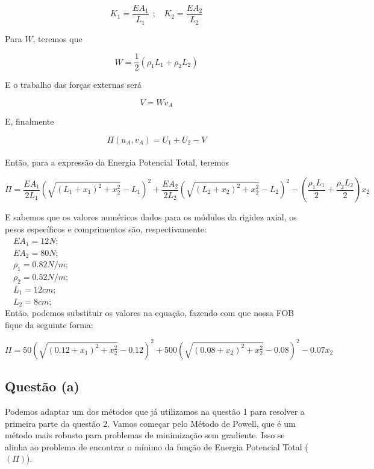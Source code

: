 \documentclass[a4paper, 12pt]{article}
\begin{document}
\begin{equation}
    K_1 = \frac{EA_1}{L_1} \>\ ;\>\ \>\ K_2 = \frac{EA_2}{L_2}
\end{equation}

Para $W$, teremos que

\begin{equation}
    W = \frac{1}{2}(\rho_1 L_1 + \rho_2 L_2)
\end{equation}

E o trabalho das forças externas será

\begin{equation}
    V = W v_A
\end{equation}

E, finalmente

\begin{equation}
    \Pi (u_A, v_A) = U_1 + U_2 - V
\end{equation}\\

Então, para a expressão da Energia Potencial Total, teremos


\begin{equation}
    \Pi = \frac{EA_1}{2L_1} (\sqrt{(L_1 + x_1)^2 + x_2^2} - L_1)^2 + \frac{EA_2}{2L_2} (\sqrt{(L_2 + x_2)^2 + x_2^2} - L_2)^2 - (\frac{\rho_1 L_1}{2} + \frac{\rho_2 L_2}{2})x_2 
\end{equation}

E sabemos que os valores numéricos dados para os módulos da rigidez axial, os pesos específicos e comprimentos são, respectivamente:\\

\bullet \>\ \>\ $EA_1 = 12 N$; \\
\bullet \>\ \>\ $EA_2 = 80 N$; \\
\bullet \>\ \>\ $\rho_1 = 0.82 N/m$; \\
\bullet \>\ \>\ $\rho_2 = 0.52 N/m$; \\
\bullet \>\ \>\ $L_1 = 12cm$; \\
\bullet \>\ \>\ $L_2 =  8 cm$; \\

Então, podemos substituir os valores na equação, fazendo com que nossa FOB fique da seguinte forma:

\begin{equation}
    \Pi = 50 \left( \sqrt{(0.12 + x_1)^2 + x_2^2} - 0.12 \right)^2 + 500 \left( \sqrt{(0.08 + x_2)^2 + x_2^2} - 0.08 \right)^2 - 0.07 x_2
\end{equation}

\subsection{Questão (a)}
Podemos adaptar um dos métodos que já utilizamos na questão 1 para resolver a primeira parte da questão 2. Vamos começar pelo Método de Powell, que é um método mais robusto para problemas de minimização sem gradiente. Isso se alinha ao problema de encontrar o mínimo da função de Energia Potencial Total ($(\Pi)$).\\
\end{document}
